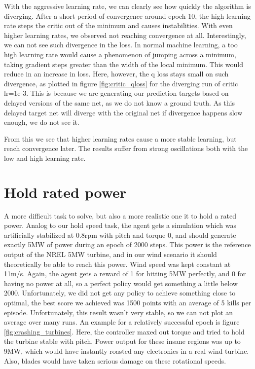 \documentclass[hyperref,beleg]{cgvpub}
\begin{document}
With the aggressive learning rate, we can clearly see how quickly the algorithm is diverging. After a short period of convergence around epoch 10, the high learning rate steps the critic out of the minimum and causes instabilities. With even higher learning rates, we observed not reaching convergence at all. Interestingly, we can not see such divergence in the loss. In normal machine learning, a too high learning rate would cause a phenomenon of jumping across a minimum, taking gradient steps greater than the width of the local minimum. This would reduce in an increase in loss. Here, however, the q loss stays small on such divergence, as plotted in figure \ref{fig:critic_qloss} for the diverging run of critic lr=1e-3. This is because we are generating our prediction targets based on delayed versions of the same net, as we do not know a ground truth. As this delayed target net will diverge with the original net if divergence happens slow enough, we do not see it.

From this we see that higher learning rates cause a more stable learning, but reach convergence later. The results suffer from strong oscillations both with the low and high learning rate.

\section{Hold rated power}
A more difficult task to solve, but also a more realistic one it to hold a rated power. Analog to our hold speed task, the agent gets a simulation which was artificially stabilized at 0.8rpm with pitch and torque 0, and should generate exactly 5MW of power during an epoch of 2000 steps. This power is the reference output of the NREL 5MW turbine, and in our wind scenario it should theoretically be able to reach this power. Wind speed was kept constant at 11m/s. Again, the agent gets a reward of 1 for hitting 5MW perfectly, and 0 for having no power at all, so a perfect policy would get something a little below 2000. Unfortunately, we did not get any policy to achieve something close to optimal, the best score we achieved was 1500 points with an average of 5 kills per episode. Unfortunately, this result wasn't very stable, so we can not plot an average over many runs. An example for a relatively successful epoch is figure \ref{fig:crashing_turbines}. Here, the controller maxed out torque and tried to hold the turbine stable with pitch. Power output for these insane regions was up to 9MW, which would have instantly roasted any electronics in a real wind turbine. Also, blades would have taken serious damage on these rotational speeds.
\end{document}
